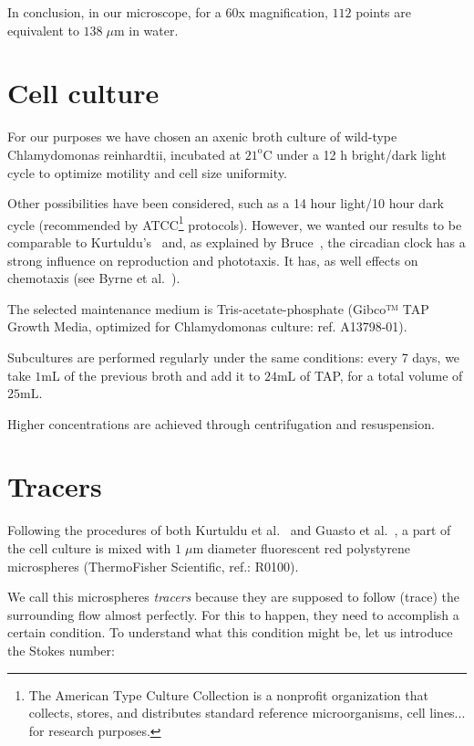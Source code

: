 In conclusion, in our microscope, for a 60x magnification, $112$ points are equivalent to $138 \; \mu \textrm{m}$ in water.

\section{Cell culture}

For our purposes we have chosen an axenic broth culture of wild-type Chlamydomonas reinhardtii, incubated at $21^\textrm{o} \textrm{C}$ under a 12 h bright/dark light cycle to optimize motility and cell size uniformity.

Other possibilities have been considered, such as a 14 hour light/10 hour dark cycle (recommended by ATCC\footnote{The American Type Culture Collection is a nonprofit organization that collects, stores, and distributes standard reference microorganisms, cell lines... for research purposes.} protocols). However, we wanted our results to be comparable to Kurtuldu's~\cite{Kurtuldu2011} and, as explained by Bruce~\cite{Bruce}, the circadian clock has a strong influence on reproduction and phototaxis. It has, as well effects on chemotaxis (see Byrne et al.~\cite{Byrne}).

The selected maintenance medium is Tris-acetate-phosphate (Gibco™ TAP Growth Media, optimized for Chlamydomonas culture: ref. A13798-01). 

Subcultures are performed regularly under the same conditions: every 7 days, we take $1 \textrm{mL}$ of the previous broth and add it to $24 \textrm{mL}$ of TAP, for a total volume of $25 \textrm{mL}$.

Higher concentrations are achieved through centrifugation and resuspension.

\section{Tracers}

Following the procedures of both Kurtuldu et al.~\cite{Kurtuldu2011} and Guasto et al.~\cite{Guasto}, a part of the cell culture is mixed with $1 \; \mu \textrm{m}$ diameter fluorescent red polystyrene microspheres (ThermoFisher Scientific, ref.: R0100). 

We call this microspheres \textit{tracers} because they are supposed to follow (trace) the surrounding flow almost perfectly. For this to happen, they need to accomplish a certain condition. To understand what this condition might be, let us introduce the Stokes number:

